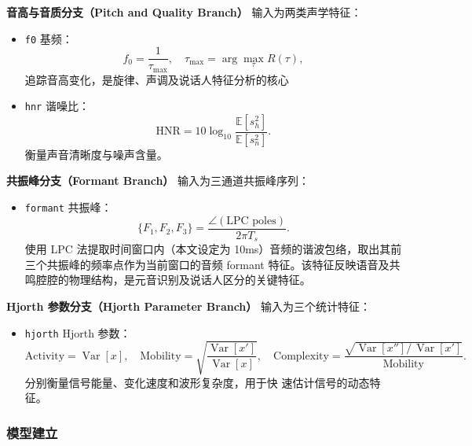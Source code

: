 \documentclass[a4paper,12pt]{article}
\begin{document}
\textbf{音高与音质分支（Pitch and Quality Branch）}  
    输入为两类声学特征：
    \begin{itemize}
        \item \texttt{f0} 基频：
        \begin{equation}
            f_0 = \frac{1}{\tau_{\max}},\quad \tau_{\max} = \arg\max_{\tau} R(\tau),
        \end{equation}
        追踪音高变化，是旋律、声调及说话人特征分析的核心
        
        \item \texttt{hnr} 谐噪比：
        \begin{equation}
            \mathrm{HNR} = 10\log_{10}\frac{\mathbb{E}[s_h^2]}{\mathbb{E}[s_n^2]}.
        \end{equation}
        衡量声音清晰度与噪声含量。
    \end{itemize}
    
\textbf{共振峰分支（Formant Branch）}  
    输入为三通道共振峰序列：
    \begin{itemize}
        \item \texttt{formant} 共振峰：
        \begin{equation}
            \{F_1,F_2,F_3\} = \frac{\angle(\text{LPC poles})}{2\pi T_s}.
        \end{equation}
        使用 LPC 法提取时间窗口内（本文设定为 10ms）音频的谐波包络，取出其前三个共振峰的频率点作为当前窗口的音频 formant 特征。该特征反映语音及共鸣腔腔的物理结构，是元音识别及说话人区分的关键特征。
    \end{itemize}
    
\textbf{Hjorth 参数分支（Hjorth Parameter Branch）}  
    输入为三个统计特征：
    \begin{itemize}
        \item \texttt{hjorth} Hjorth 参数：
        \begin{equation}
            \mathrm{Activity} = \operatorname{Var}[x], 
            \quad\mathrm{Mobility} = \sqrt{\frac{\operatorname{Var}[x']}{\operatorname{Var}[x]}},
            \quad\mathrm{Complexity} = \frac{\sqrt{\operatorname{Var}[x'']/\,\operatorname{Var}[x']}}{\mathrm{Mobility}}.
        \end{equation}
        分别衡量信号能量、变化速度和波形复杂度，用于快
速估计信号的动态特征。
    \end{itemize}



\subsubsection{模型建立}
\end{document}
